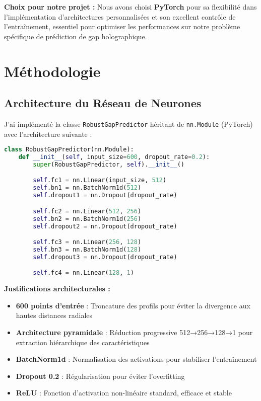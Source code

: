 \documentclass[11pt,a4paper,twocolumn]{article}
\begin{document}
\textbf{Choix pour notre projet :}
Nous avons choisi \textbf{PyTorch} pour sa flexibilité dans l'implémentation d'architectures personnalisées et son excellent contrôle de l'entraînement, essentiel pour optimiser les performances sur notre problème spécifique de prédiction de gap holographique.

\section{Méthodologie}

\subsection{Architecture du Réseau de Neurones}

J'ai implémenté la classe \texttt{RobustGapPredictor} héritant de \texttt{nn.Module} (PyTorch) avec l'architecture suivante :

\begin{lstlisting}[language=Python, basicstyle=\tiny]
class RobustGapPredictor(nn.Module):
    def __init__(self, input_size=600, dropout_rate=0.2):
        super(RobustGapPredictor, self).__init__()

        self.fc1 = nn.Linear(input_size, 512)
        self.bn1 = nn.BatchNorm1d(512)
        self.dropout1 = nn.Dropout(dropout_rate)

        self.fc2 = nn.Linear(512, 256)
        self.bn2 = nn.BatchNorm1d(256)
        self.dropout2 = nn.Dropout(dropout_rate)

        self.fc3 = nn.Linear(256, 128)
        self.bn3 = nn.BatchNorm1d(128)
        self.dropout3 = nn.Dropout(dropout_rate)

        self.fc4 = nn.Linear(128, 1)
\end{lstlisting}



\textbf{Justifications architecturales :}
\begin{itemize}
    \item \textbf{600 points d'entrée} : Troncature des profils pour éviter la divergence aux hautes distances radiales
    \item \textbf{Architecture pyramidale} : Réduction progressive 512→256→128→1 pour extraction hiérarchique des caractéristiques
    \item \textbf{BatchNorm1d} : Normalisation des activations pour stabiliser l'entraînement
    \item \textbf{Dropout 0.2} : Régularisation pour éviter l'overfitting
    \item \textbf{ReLU} : Fonction d'activation non-linéaire standard, efficace et stable
\end{itemize}
\end{document}
